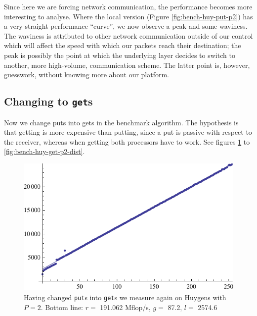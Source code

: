 \documentclass[a4paper]{article}
\begin{document}
Since here we are forcing network communication, the performance becomes more
interesting to analyse. Where the local version (Figure
\ref{fig:bench-huy-put-p2}) has a very straight performance ``curve'', we now
observe a peak and some waviness. The waviness is attributed to other network
communication outside of our control which will affect the speed with which our
packets reach their destination; the peak is possibly the point at which the
underlying layer decides to switch to another, more high-volume, communication
scheme. The latter point is, however, guesswork, without knowing more about our
platform. 

\subsection{Changing to \texttt{get}s}
Now we change puts into gets in the benchmark algorithm. The hypothesis is that
getting is more expensive than putting, since a put is passive with respect to
the receiver, whereas when getting both processors have to work. See figures
\ref{fig:bench-huy-get-p2} to \ref{fig:bench-huy-get-p2-dist}. 

\begin{figure}[h]
    \begin{center}
        \includegraphics{img/bench-huy-get-p2.pdf}
    \end{center}
    \caption{Having changed \texttt{put}s into \texttt{get}s we measure again on
    Huygens with $P=2$. Bottom line: $r=$ 191.062 Mflop/s, $g=$ 87.2, $l=$ 2574.6}
    \label{fig:bench-huy-get-p2}
\end{figure}
\end{document}
